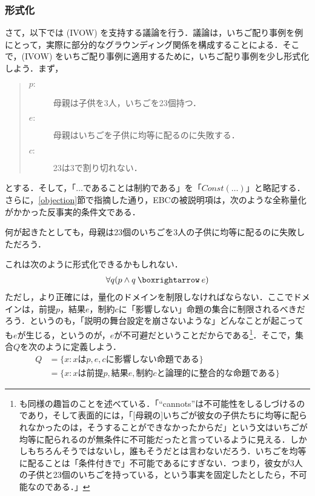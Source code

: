 \documentclass[dvipdfmx,twoside,11pt,uplatex]{jsarticle}
\theoremstyle{definition}
\begin{document}
\subsubsection{形式化}
さて，以下では (IVOW) を支持する議論を行う．議論は，いちご配り事例を例にとって，実際に部分的なグラウンディング関係を構成することによる．そこで，(IVOW) をいちご配り事例に適用するために，いちご配り事例を少し形式化しよう．まず，
\begin{quote}
\begin{description}
    \item[$p:$] 母親は子供を3人，いちごを23個持つ．
    \item[$e:$] 母親はいちごを子供に均等に配るのに失敗する．
    \item[$c:$] 23は3で割り切れない．
\end{description}
\end{quote}
とする．そして，「$\ldots$であることは制約である」を「$Const(\ldots)$」と略記する．さらに，\ref{objection}節で指摘した通り，EBCの被説明項は，次のような全称量化がかかった反事実的条件文である．
\begin{exe}
    \ex 何が起きたとしても，母親は23個のいちごを3人の子供に均等に配るのに失敗しただろう．
\end{exe}
これは次のように形式化できるかもしれない．
\begin{gather*}
    \forall q ( p \land q \necif e )
\end{gather*}
ただし，より正確には，量化のドメインを制限しなければならない．ここでドメインは，前提$p$，結果$e$，制約$c$に「影響しない」命題の集合に制限されるべきだろう．というのも，「説明の舞台設定を崩さないような」どんなことが起こっても$e$が生じる，というのが，$e$が不可避だということだからである\footnote{
\citet[131--2]{skow2016reasons}も同様の趣旨のことを述べている．「``cannots''は不可能性をしるしづけるのであり，そして表面的には，「[母親の]いちごが彼女の子供たちに均等に配られなかったのは，そうすることができなかったからだ」という文はいちごが均等に配られるのが無条件に不可能だったと言っているように見える．しかしもちろんそうではないし，誰もそうだとは言わないだろう．いちごを均等に配ることは「条件付きで」不可能であるにすぎない．つまり，彼女が3人の子供と23個のいちごを持っている，という事実を固定したとしたら，不可能なのである．」
}．そこで，集合$Q$を次のように定義しよう．
\begin{align*}
    Q&=\{x: xはp,e,cに影響しない命題である\}\\
    &=\{x: xは前提p,結果e,制約cと論理的に整合的な命題である\}
\end{align*}
\end{document}
